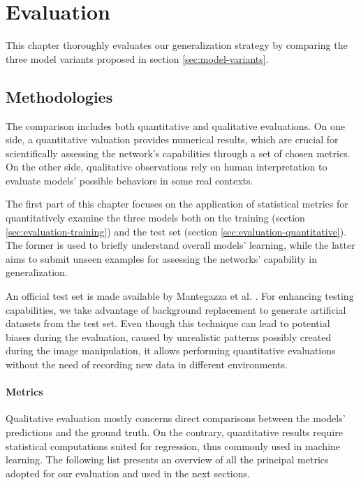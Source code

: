 \chapter{Evaluation}
\label{chap:evaluation}


This chapter thoroughly evaluates our generalization strategy by comparing the three model variants proposed in section \ref{sec:model-variants}.



\section{Methodologies}
\label{sec:evaluation-methods}

The comparison includes both quantitative and qualitative evaluations. On one side, a quantitative valuation provides numerical results, which are crucial for scientifically assessing the network's capabilities through a set of chosen metrics. On the other side, qualitative observations rely on human interpretation to evaluate models' possible behaviors in some real contexts.

The first part of this chapter focuses on the application of statistical metrics for quantitatively examine the three models both on the training (section \ref{sec:evaluation-training}) and the test set (section \ref{sec:evaluation-quantitative}). The former is used to briefly understand overall models' learning, while the latter aims to submit unseen examples for assessing the networks' capability in generalization.

An official test set is made available by Mantegazza et al. \cite{mantegazza2019visionbased}. For enhancing testing capabilities, we take advantage of background replacement to generate artificial datasets from the test set. Even though this technique can lead to potential biases during the evaluation, caused by unrealistic patterns possibly created during the image manipulation, it allows performing quantitative evaluations without the need of recording new data in different environments.

\subsubsection*{Metrics}

Qualitative evaluation mostly concerns direct comparisons between the models' predictions and the ground truth. On the contrary, quantitative results require statistical computations suited for regression, thus commonly used in machine learning. The following list presents an overview of all the principal metrics adopted for our evaluation and used in the next sections.

